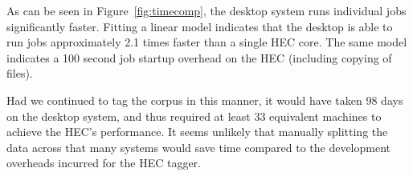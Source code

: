 As can be seen in Figure~\ref{fig:timecomp}, the desktop system runs individual jobs significantly faster.  Fitting a linear model indicates that the desktop is able to run jobs approximately 2.1 times faster than a single HEC core.  The same model indicates a 100 second job startup overhead on the HEC (including copying of files).

Had we continued to tag the corpus in this manner, it would have taken 98 days on the desktop system, and thus required at least 33 equivalent machines to achieve the HEC's performance.  It seems unlikely that manually splitting the data across that many systems would save time compared to the development overheads incurred for the HEC tagger.

